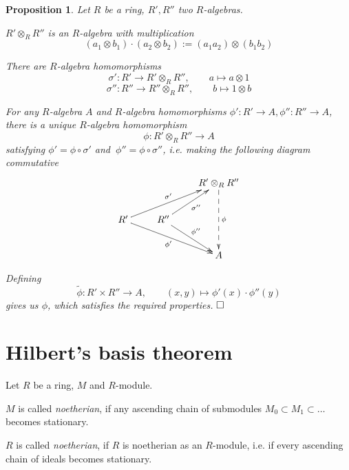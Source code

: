 \documentclass[11pt]{book}
\newtheorem{proposition}[theorem]{Proposition}
\theoremstyle{nonumberbreak}
\newenvironment{defin}[1][]{\ifthenelse{\equal{#1}{}}{\definition}{\definition[#1]}\rm}{\enddefinition}
\newenvironment{pr}[1][]{\ifthenelse{\equal{#1}{}}{\proof}{\proof[#1]}\rm}{\endproof}
\begin{document}
\begin{spacing}{1.3}
\begin{proposition} %
Let $R$ be a ring, $R', R''$ two $R$-algebras. 
\begin{compactenum}
\item $R' \otimes_R R''$ is an $R$-algebra with multiplication
$$(a_1 \otimes b_1) \cdot (a_2 \otimes b_2):= (a_1 a_2) \otimes (b_1 b_2)$$
\item There are $R$-algebra homomorphisms
$$\sigma': R' \longrightarrow R' \otimes_R R'', \qquad a \mapsto a \otimes 1$$
$$\sigma'':R'' \longrightarrow R'' \otimes_R R'', \qquad b \mapsto 1 \otimes b$$
\item For any $R$-algebra $A$ and $R$-algebra homomorphisms $\phi':R' \longrightarrow A, \phi'': R'' \longrightarrow A$, there is a unique $R$-algebra homomorphism
$$\phi: R' \otimes_R R'' \longrightarrow A$$
satisfying $\phi'=\phi \circ \sigma'$ and $\ \phi''=\phi \circ \sigma''$, i.e. making the following diagram commutative
$$\begin{xy}
\xymatrix{
&& R' \otimes_R R'' \ar@{-->}[dd]^{\phi} \\ R' \ar[rru]^{\sigma'} \ar[rrd]_{\phi'} & R'' \ar[ru]_{\sigma''} \ar[rd]^{\phi''} & \\ && A 
}
\end{xy}$$
\end{compactenum}
\begin{pr}
Defining $$\tilde{\phi}: R' \times R'' \longrightarrow A, \qquad (x,y) \mapsto \phi'(x) \cdot \phi''(y)$$
gives us $\phi$, which satisfies the required properties. $\hfill \Box$
\end{pr}
\end{proposition}


\renewcommand*\thesection{§ \arabic{section}\quad }
\section{Hilbert's basis theorem}
\renewcommand*\thesection{\arabic{section}}

\begin{defin} %
Let $R$ be a ring, $M$ and $R$-module.
\begin{compactenum}
\item $M$ is called \textit{noetherian}, if any ascending chain of submodules $M_0 \subset M_1 \subset \ldots$ becomes stationary.
\item $R$ is called \textit{noetherian}, if $R$ is noetherian as an $R$-module, i.e. if every ascending chain of ideals becomes stationary.
\end{compactenum}
\end{defin}




\end{spacing}
\end{document}
